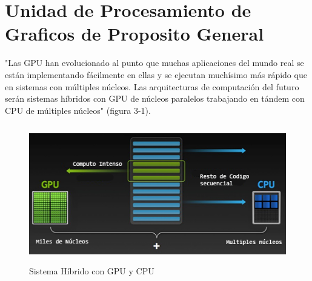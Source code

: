 \chapter{Unidad de Procesamiento de Graficos de Proposito General}
"Las GPU han evolucionado al punto que muchas aplicaciones del mundo real se están implementando fácilmente en ellas y se ejecutan muchísimo más rápido que en sistemas con múltiples núcleos. Las arquitecturas de computación del futuro serán sistemas híbridos con GPU de núcleos paralelos trabajando en tándem con CPU de múltiples núcleos" (figura 3-1).\cite{GPUIntro}
\begin{figure}[H]
                      \centering
                              \includegraphics[height=6cm]{img/how-gpu-acceleration-works.png}
                      \caption{Sistema Híbrido con GPU y CPU}
\end{figure}
